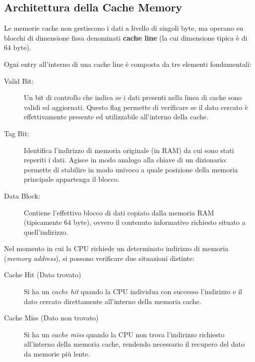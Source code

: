 \documentclass[12pt]{report}
\begin{document}
	\subsection{Architettura della Cache Memory}
	
	Le memorie cache non gestiscono i dati a livello di singoli byte, ma operano su blocchi di dimensione fissa denominati \textbf{cache line} (la cui dimensione tipica è di $64\text{ byte}$).
	
	Ogni entry all'interno di una cache line è composta da tre elementi fondamentali:
	\begin{description}
		\item[Valid Bit:] Un bit di controllo che indica se i dati presenti nella linea di cache sono validi ed aggiornati. Questo flag permette di verificare se il dato cercato è effettivamente presente ed utilizzabile all'interno della cache.
		\item[Tag Bit:] Identifica l'indirizzo di memoria originale (in RAM) da cui sono stati reperiti i dati. Agisce in modo analogo alla chiave di un dizionario: permette di stabilire in modo univoco a quale posizione della memoria principale appartenga il blocco.
		\item[Data Block:] Contiene l'effettivo blocco di dati copiato dalla memoria RAM (tipicamente $64\text{ byte}$), ovvero il contenuto informativo richiesto situato a quell'indirizzo.
	\end{description}
	
	Nel momento in cui la CPU richiede un determinato indirizzo di memoria (\textit{memory address}), si possono verificare due situazioni distinte:
	
	\begin{description}
		
		\item [Cache Hit (Dato trovato)] Si ha un \textit{cache hit} quando la CPU individua con successo l'indirizzo e il dato cercato direttamente all'interno della memoria cache.
		
		\item [Cache Miss (Dato non trovato)] Si ha un \textit{cache miss} quando la CPU non trova l'indirizzo richiesto all'interno della memoria cache, rendendo necessario il recupero del dato da memorie più lente.
		
	\end{description}
	
\end{document}
